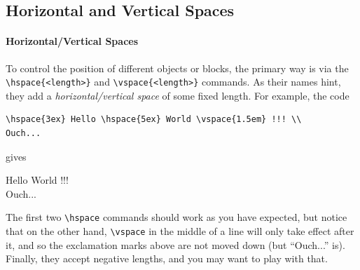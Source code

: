 
\subsection{Horizontal and Vertical Spaces}

\paragraph{Horizontal/Vertical Spaces}
To control the position of different objects or blocks, the primary way is via the \texttt{\textbackslash hspace\{<length>\}} and \texttt{\textbackslash vspace\{<\allowbreak length>\}} commands. As their names hint, they add a \textit{horizontal/vertical space} of some fixed length. For example, the code
\begin{lstlisting}
\hspace{3ex} Hello \hspace{5ex} World \vspace{1.5em} !!! \\
Ouch...
\end{lstlisting}
gives \par
\hspace{3ex} Hello \hspace{5ex} World \vspace{1.5em} !!! \\
Ouch...\par
The first two \texttt{\textbackslash hspace} commands should work as you have expected, but notice that on the other hand, \texttt{\textbackslash vspace} in the middle of a line will only take effect after it, and so the exclamation marks above are not moved down (but “Ouch...” is). Finally, they accept negative lengths, and you may want to play with that.\par

